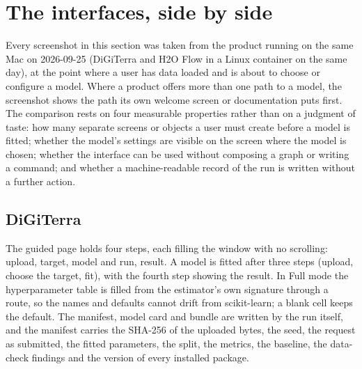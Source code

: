 \section{The interfaces, side by side}
\label{sec:interfaces}

Every screenshot in this section was taken from the product running on the same Mac on 2026-09-25 (DiGiTerra and H2O Flow in a Linux container on the same day), at the point where a user has data loaded and is about to choose or configure a model. Where a product offers more than one path to a model, the screenshot shows the path its own welcome screen or documentation puts first. The comparison rests on four measurable properties rather than on a judgment of taste: how many separate screens or objects a user must create before a model is fitted; whether the model's settings are visible on the screen where the model is chosen; whether the interface can be used without composing a graph or writing a command; and whether a machine-readable record of the run is written without a further action.

\subsection{DiGiTerra}



The guided page holds four steps, each filling the window with no scrolling: upload, target, model and run, result. A model is fitted after three steps (upload, choose the target, fit), with the fourth step showing the result. In Full mode the hyperparameter table is filled from the estimator's own signature through a route, so the names and defaults cannot drift from scikit-learn; a blank cell keeps the default. The manifest, model card and bundle are written by the run itself, and the manifest carries the SHA-256 of the uploaded bytes, the seed, the request as submitted, the fitted parameters, the split, the metrics, the baseline, the data-check findings and the version of every installed package.

